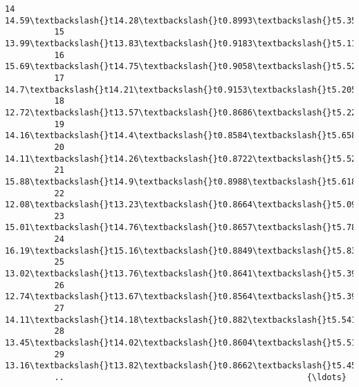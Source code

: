 \documentclass[11pt]{article}
\begin{document}
\begin{Verbatim}[commandchars=\\\{\}]
          14   14.59\textbackslash{}t14.28\textbackslash{}t0.8993\textbackslash{}t5.351\textbackslash{}t3.333\textbackslash{}t4.185\textbackslash{}t4.7{\ldots}
          15   13.99\textbackslash{}t13.83\textbackslash{}t0.9183\textbackslash{}t5.119\textbackslash{}t3.383\textbackslash{}t5.234\textbackslash{}t4.7{\ldots}
          16   15.69\textbackslash{}t14.75\textbackslash{}t0.9058\textbackslash{}t5.527\textbackslash{}t3.514\textbackslash{}t1.599\textbackslash{}t5.0{\ldots}
          17   14.7\textbackslash{}t14.21\textbackslash{}t0.9153\textbackslash{}t5.205\textbackslash{}t3.466\textbackslash{}t1.767\textbackslash{}t4.64{\ldots}
          18   12.72\textbackslash{}t13.57\textbackslash{}t0.8686\textbackslash{}t5.226\textbackslash{}t3.049\textbackslash{}t4.102\textbackslash{}t4.9{\ldots}
          19   14.16\textbackslash{}t14.4\textbackslash{}t0.8584\textbackslash{}t5.658\textbackslash{}t3.129\textbackslash{}t3.072\textbackslash{}t5.17{\ldots}
          20   14.11\textbackslash{}t14.26\textbackslash{}t0.8722\textbackslash{}t5.52\textbackslash{}t3.168\textbackslash{}t2.688\textbackslash{}t5.21{\ldots}
          21   15.88\textbackslash{}t14.9\textbackslash{}t0.8988\textbackslash{}t5.618\textbackslash{}t3.507\textbackslash{}t0.7651\textbackslash{}t5.0{\ldots}
          22   12.08\textbackslash{}t13.23\textbackslash{}t0.8664\textbackslash{}t5.099\textbackslash{}t2.936\textbackslash{}t1.415\textbackslash{}t4.9{\ldots}
          23   15.01\textbackslash{}t14.76\textbackslash{}t0.8657\textbackslash{}t5.789\textbackslash{}t3.245\textbackslash{}t1.791\textbackslash{}t5.0{\ldots}
          24   16.19\textbackslash{}t15.16\textbackslash{}t0.8849\textbackslash{}t5.833\textbackslash{}t3.421\textbackslash{}t0.903\textbackslash{}t5.3{\ldots}
          25   13.02\textbackslash{}t13.76\textbackslash{}t0.8641\textbackslash{}t5.395\textbackslash{}t3.026\textbackslash{}t3.373\textbackslash{}t4.8{\ldots}
          26   12.74\textbackslash{}t13.67\textbackslash{}t0.8564\textbackslash{}t5.395\textbackslash{}t2.956\textbackslash{}t2.504\textbackslash{}t4.8{\ldots}
          27   14.11\textbackslash{}t14.18\textbackslash{}t0.882\textbackslash{}t5.541\textbackslash{}t3.221\textbackslash{}t2.754\textbackslash{}t5.03{\ldots}
          28   13.45\textbackslash{}t14.02\textbackslash{}t0.8604\textbackslash{}t5.516\textbackslash{}t3.065\textbackslash{}t3.531\textbackslash{}t5.0{\ldots}
          29   13.16\textbackslash{}t13.82\textbackslash{}t0.8662\textbackslash{}t5.454\textbackslash{}t2.975\textbackslash{}t0.8551\textbackslash{}t5{\ldots}
          ..                                                 {\ldots}

\end{Verbatim}
\end{document}
